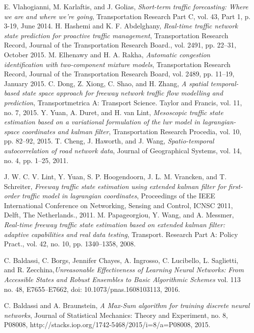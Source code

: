 \documentclass[a4paper,12pt]{article}
\begin{document}
\begin{thebibliography}{4}
E. Vlahogianni, M. Karlaftis, and J. Golias, \textit{Short-term traffic forecasting: Where we are and where we're going},
Transportation Research Part C, vol. 43, Part 1, p. 3-19, June 2014.
 H. Hashemi and K. F. Abdelghany, \textit{Real-time traffic network
state prediction for proactive traffic management},
Transportation Research Record, Journal of the Transportation
Research Board., vol. 2491, pp. 22–31, October 2015.
 M. Elhenawy and H. A. Rakha, \textit{Automatic congestion
identification with two-component mixture models}, Transportation Research Record, Journal of the Transportation Research Board, vol. 2489, pp. 11–19, January 2015.
 C. Dong, Z. Xiong, C. Shao, and H. Zhang, \textit{A spatial temporal-based state space approach for freeway network traffic flow modelling and prediction}, Transportmetrica A: Transport Science. Taylor and Francis, vol. 11, no. 7, 2015.
 Y. Yuan, A. Duret, and H. van Lint, \textit{Mesoscopic traffic
state estimation based on a variational formulation of the lwr model in lagrangian-space coordinates and kalman filter},
Transportation Research Procedia, vol. 10, pp. 82–92, 2015.
 T. Cheng, J. Haworth, and J. Wang, \textit{Spatio-temporal autocorrelation
of road network data}, Journal of Geographical
Systems, vol. 14, no. 4, pp. 1–25, 2011.

 J. W. C. V. Lint, Y. Yuan, S. P. Hoogendoorn, J. L. M. Vrancken, and T. Schreiter, \textit{Freeway traffic state estimation
using extended kalman filter for first-order traffic model in
lagrangian coordinates}, Proceedings of the IEEE International Conference on Networking, Sensing and Control, ICNSC 2011, Delft, The Netherlands., 2011.
 M. Papageorgiou, Y. Wang, and A. Messmer, \textit{Real-time freeway traffic state estimation based on extended kalman
filter: adaptive capabilities and real data testing}, Transport. Research Part A: Policy Pract., vol. 42, no. 10, pp. 1340–1358, 2008.

C. Baldassi, C. Borgs, Jennifer Chayes, A.
Ingrosso, C. Lucibello, L. Saglietti, and R. Zecchina,\textit{Unreasonable Effectiveness of Learning Neural Networks: From Accessible States and
Robust Ensembles to Basic Algorithmic Schemes} vol. 113 no. 48,  E7655–E7662, doi: 10.1073/pnas.1608103113, 2016.

 C. Baldassi and A. Braunstein, \textit{A Max-Sum algorithm for training discrete neural networks}, Journal of Statistical Mechanics: Theory and Experiment, no. 8, P08008, http://stacks.iop.org/1742-5468/2015/i=8/a=P08008, 2015.
\end{thebibliography}
\end{document}
